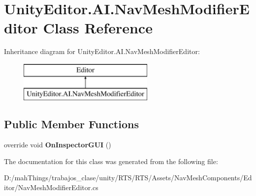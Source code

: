 \hypertarget{class_unity_editor_1_1_a_i_1_1_nav_mesh_modifier_editor}{}\section{Unity\+Editor.\+A\+I.\+Nav\+Mesh\+Modifier\+Editor Class Reference}
\label{class_unity_editor_1_1_a_i_1_1_nav_mesh_modifier_editor}
Inheritance diagram for Unity\+Editor.\+A\+I.\+Nav\+Mesh\+Modifier\+Editor\+:\begin{figure}[H]
\begin{center}
\leavevmode
\includegraphics[height=2.000000cm]{class_unity_editor_1_1_a_i_1_1_nav_mesh_modifier_editor}
\end{center}
\end{figure}
\subsection*{Public Member Functions}
\begin{DoxyCompactItemize}
\item 
\mbox{\label{class_unity_editor_1_1_a_i_1_1_nav_mesh_modifier_editor_a572f1742afd868908d11b0f5ad36453c}} 
override void {\bfseries On\+Inspector\+G\+UI} ()
\end{DoxyCompactItemize}


The documentation for this class was generated from the following file\+:\begin{DoxyCompactItemize}
\item 
D\+:/mah\+Things/trabajos\+\_\+clase/unity/\+R\+T\+S/\+R\+T\+S/\+Assets/\+Nav\+Mesh\+Components/\+Editor/Nav\+Mesh\+Modifier\+Editor.\+cs\end{DoxyCompactItemize}
